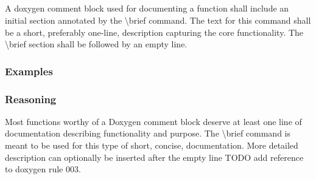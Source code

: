 \subsection*{\doxygenRule{}}

A doxygen comment block used for documenting a function shall include an initial section annotated by the \textbackslash brief command. The text for this command shall be a short, preferably one-line, description capturing the core functionality. The \textbackslash brief section shall be followed by an empty line.

\subsubsection*{Examples}

\noindent
\begin{minipage}[t]{0.47\textwidth}
    
\end{minipage}\hfill
\begin{minipage}[t]{0.47\textwidth}
    
\end{minipage}

\subsubsection*{Reasoning}

 Most functions worthy of a Doxygen comment block deserve at least one line of documentation describing functionality and purpose. The \textbackslash brief command is meant to be used for this type of short, concise, documentation. More detailed description can optionally be inserted after the empty line TODO add reference to doxygen rule 003.
